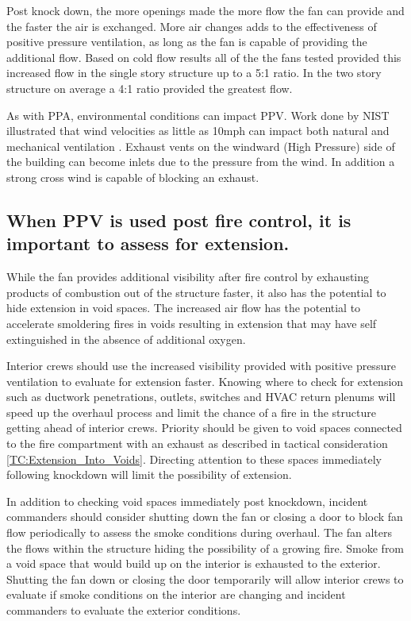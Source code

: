 \documentclass{article}
\begin{document}
Post knock down, the more openings made the more flow the fan can provide and the faster the air is exchanged. More air changes adds to the effectiveness of positive pressure ventilation, as long as the fan is capable of providing the additional flow. Based on cold flow results all of the the fans tested provided this increased flow in the single story structure up to a 5:1 ratio. In the two story structure on average a 4:1 ratio provided the greatest flow. 

As with PPA, environmental conditions can impact PPV. Work done by NIST illustrated that wind velocities as little as 10mph can impact both natural and mechanical ventilation \cite{KerberMadrzykowskiLabWindDriven}. Exhaust vents on the windward (High Pressure) side of the building can become inlets due to the pressure from the wind. In addition a strong cross wind is capable of blocking an exhaust. 

\subsection{When PPV is used post fire control, it is important to assess for extension.} \label{Assess_For_Extension}
While the fan provides additional visibility after fire control by exhausting products of combustion out of the structure faster, it also has the potential to hide extension in void spaces. The increased air flow has the potential to accelerate smoldering fires in voids resulting in extension that may have self extinguished in the absence of additional oxygen. 

Interior crews should use the increased visibility provided with positive pressure ventilation to evaluate for extension faster. Knowing where to check for extension such as ductwork penetrations, outlets, switches and HVAC return plenums will speed up the overhaul process and limit the chance of a fire in the structure getting ahead of interior crews. Priority should be given to void spaces connected to the fire compartment with an exhaust as described in tactical consideration \ref{TC:Extension_Into_Voids}. Directing attention to these spaces immediately following knockdown will limit the possibility of extension.  

In addition to checking void spaces immediately post knockdown, incident commanders should consider shutting down the fan or closing a door to block fan flow periodically to assess the smoke conditions during overhaul. The fan alters the flows within the structure hiding the possibility of a growing fire. Smoke from a void space that would build up on the interior is exhausted to the exterior. Shutting the fan down or closing the door temporarily will allow interior crews to evaluate if smoke conditions on the interior are changing and incident commanders to evaluate the exterior conditions.
\end{document}
